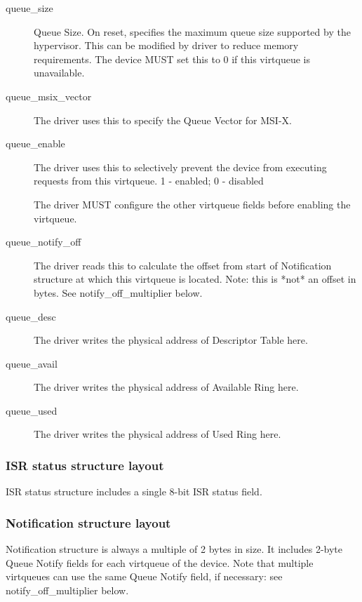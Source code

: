 \begin{description}
\item[queue_size]
        Queue Size.  On reset, specifies the maximum queue size supported by
        the hypervisor. This can be modified by driver to reduce memory requirements.
        The device MUST set this to 0 if this virtqueue is unavailable.

\item[queue_msix_vector]
        The driver uses this to specify the Queue Vector for MSI-X.

\item[queue_enable]
        The driver uses this to selectively prevent the device from executing requests from this virtqueue.
        1 - enabled; 0 - disabled

        The driver MUST configure the other virtqueue fields before enabling
        the virtqueue.

\item[queue_notify_off]
        The driver reads this to calculate the offset from start of Notification structure at
        which this virtqueue is located.
        Note: this is *not* an offset in bytes. See notify_off_multiplier below.

\item[queue_desc]
        The driver writes the physical address of Descriptor Table here.

\item[queue_avail]
        The driver writes the physical address of Available Ring here.

\item[queue_used]
        The driver writes the physical address of Used Ring here.
\end{description}

\subsubsection{ISR status structure layout}\label{sec:Virtio Transport Options / Virtio Over PCI Bus / PCI Device Layout / ISR status structure layout}
ISR status structure includes a single 8-bit ISR status field.

\subsubsection{Notification structure layout}\label{sec:Virtio Transport Options / Virtio Over PCI Bus / PCI Device Layout / Notification structure layout}
Notification structure is always a multiple of 2 bytes in size.
It includes 2-byte Queue Notify fields for each virtqueue of
the device. Note that multiple virtqueues can use the same
Queue Notify field, if necessary: see notify_off_multiplier below.

